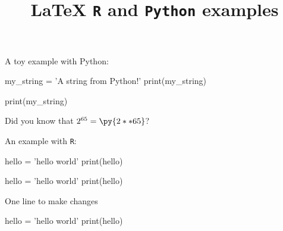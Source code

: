 \documentclass[a4paper,12pt]{article}
\begin{document}
\title{\textbf{\LaTeX{}  \texttt{R} and \texttt{Python} examples}}
\date{}

\maketitle

A toy example with Python:
\begin{pycode}
my_string = 'A string from Python!'
print(my_string)
\end{pycode}

\begin{pyblock}
print(my_string)
\end{pyblock}
\begin{quotation}
\printpythontex
\end{quotation}

Did you know that $2^{65} = \py{2**65}$?

An example with \texttt{R}:

\begin{Rcode}
hello = 'hello world'
print(hello)
\end{Rcode}

\begin{Rblock}
hello = 'hello world'
print(hello)
\end{Rblock}

One line to make changes

\begin{Rblock}
hello = 'hello world'
print(hello)
\end{Rblock}
\end{document}
